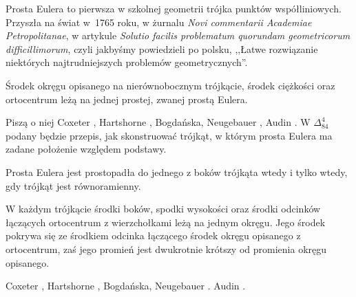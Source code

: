 %

Prosta Eulera to pierwsza w szkolnej geometrii trójka punktów współliniowych.
Przyszła na świat w~1765 roku, w żurnalu \emph{Novi commentarii Academiae Petropolitanae}, w artykule \emph{Solutio facilis problematum quorundam geometricorum difficillimorum}, czyli jakbyśmy powiedzieli po polsku, ,,Łatwe rozwiązanie niektórych najtrudniejszych problemów geometrycznych''.

\begin{proposition}
	\label{prosta_eulera}
	Środek okręgu opisanego na nierównobocznym trójkącie, środek ciężkości oraz ortocentrum leżą na jednej prostej, zwanej prostą Eulera.
\end{proposition}

Piszą o niej
Coxeter \cite[s. 32, 33]{coxeter_1967},
Hartshorne \cite[s. 54, 55]{hartshorne2000},
Bogdańska, Neugebauer \cite[s. 84]{neugebauer_2018},
Audin \cite[s. 61]{audin_2003}.
W $\Delta_{84}^{4}$ podany będzie przepis, jak skonstruować trójkąt, w którym prosta Eulera ma zadane położenie względem podstawy.

\begin{proposition}
	Prosta Eulera jest prostopadła do jednego z boków trójkąta wtedy i tylko wtedy, gdy trójkąt jest równoramienny.
\end{proposition}

\begin{proposition}
\label{okrag_dziewieciu_punktow}%
	W każdym trójkącie środki boków, spodki wysokości oraz środki odcinków łączących ortocentrum z wierzchołkami leżą na jednym okręgu.
	Jego środek pokrywa się ze środkiem odcinka łączącego środek okręgu opisanego z ortocentrum, zaś jego promień jest dwukrotnie krótszy od promienia okręgu opisanego.
\end{proposition}


Coxeter \cite[s. 34, 35]{coxeter_1967}, Hartshorne \cite[s. 57, 60]{hartshorne2000}, Bogdańska, Neugebauer \cite[s. 85, 86]{neugebauer_2018}.
Audin \cite[s. 62]{audin_2003}.

